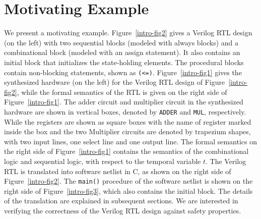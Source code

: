 \section{Motivating Example} 



%
We present a motivating example. 
%  
Figure~\ref{intro-fig2} gives a Verilog RTL design (on the left) with 
two sequential blocks (modeled with always blocks) and a combinational block 
(modeled with an assign statement). It also contains an initial block that 
initializes the state-holding elements. The procedural blocks contain 
non-blocking statements, shown as \texttt{(<=)}.  Figure~\ref{intro-fig1} 
gives the synthesized hardware (on the left) for the Verilog RTL design 
of Figure~\ref{intro-fig2}, while the formal semantics of the RTL is given 
on the right side of Figure~\ref{intro-fig1}.  The adder circuit and 
multiplier circuit in the synthesized hardware are shown in vertical boxes, 
denoted by \texttt{ADDER} and \texttt{MUL}, respectively.  While the 
registers are shown as square boxes with the name of register marked 
inside the box and the two Multiplier circuits are denoted by trapezium 
shapes, with two input lines, one select line and one output line.  
The formal semantics on the right side of Figure~\ref{intro-fig1} 
contains the semantics of the combinational logic and sequential logic, 
with respect to the temporal variable $t$. 
%
The Verilog RTL is translated into software netlist in C, as shown on the 
right side of Figure~\ref{intro-fig2}.  The \texttt{main()} procedure of 
the software netlist is shown on the right side of Figure~\ref{intro-fig3}, 
which also contains the initial block.
%  
The details of the translation are explained in subsequent sections.  
We are interested in verifying the correctness of the Verilog RTL design 
against safety properties. 
%

